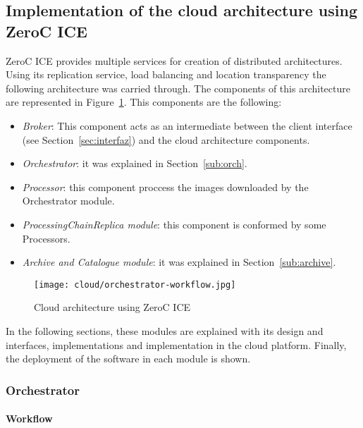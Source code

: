 \subsection{Implementation of the cloud architecture using ZeroC ICE}

ZeroC ICE provides multiple services for creation of distributed
architectures. Using its replication service, load balancing and location
transparency the following architecture was carried through. The components of
this architecture are represented in Figure~\ref{fig:ice-architecture}. This components are the
following:

\begin{itemize}
\item \emph{Broker}: This component acts as an intermediate between the client
  interface (see Section~\ref{sec:interfaz}) and the cloud architecture
  components. 
\item \emph{Orchestrator}: it was explained in Section~\ref{sub:orch}.
\item \emph{Processor}: this component proccess the images downloaded by the
  Orchestrator module.
\item \emph{ProcessingChainReplica module}: this component is conformed by some
  Processors.
\item \emph{Archive and Catalogue module}: it was explained in Section~\ref{sub:archive}.
\end{itemize}

\begin{figure}[!h]
\begin{center}
\texttt{[image: cloud/orchestrator-workflow.jpg]}
\caption{Cloud architecture using ZeroC ICE}
\label{fig:ice-architecture}
\end{center}
\end{figure}

In the following sections, these modules are explained with its design and interfaces,
implementations and implementation in the cloud platform. Finally, the
deployment of the software in each module is shown.

\subsubsection{Orchestrator}

\paragraph{Workflow}~\\

